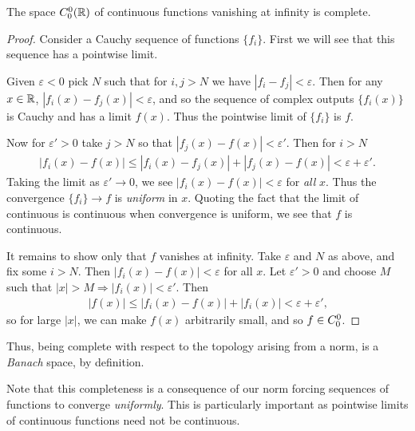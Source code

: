       \begin{thm}
        \label{thm:c00complete}
        The space ${C^0_0}(\mathbb{R})$ of continuous functions vanishing at infinity is complete.
      \end{thm}
      \begin{proof}
        Consider a Cauchy sequence of \Coo functions $\{f_i\}$.
        First we will see that this sequence has a pointwise limit.

        Given $\varepsilon<0$ pick $N$ such that for $i,j>N$ we have $|f_i-f_j|<\varepsilon$.
        Then for any $x\in\mathbb{R}$, $|f_i(x)-f_j(x)|<\varepsilon$, and so the sequence of complex outputs $\{f_i(x)\}$ is Cauchy and has a limit $f(x)$.
        Thus the pointwise limit of $\{f_i\}$ is $f$.
       
        Now for $\varepsilon'>0$ take $j>N$ so that $|f_j(x)-f(x)|<\varepsilon'$.
        Then for $i>N$
        \begin{align*}
          |f_i(x)-f(x)|\le|f_i(x)-f_j(x)|+|f_j(x)-f(x)|<\varepsilon+\varepsilon'\text{.}
        \end{align*}
        Taking the limit as $\varepsilon'\rightarrow0$, we see $|f_i(x)-f(x)|<\varepsilon$ for \emph{all} $x$.
        Thus the convergence $\{f_i\}\rightarrow f$ is \emph{uniform} in $x$.
        Quoting the fact that the limit of continuous is continuous when convergence is uniform, we see that $f$ is continuous.\footnotemark

        It remains to show only that $f$ vanishes at infinity.
        Take $\varepsilon$ and $N$ as above, and fix some $i>N$.
        Then $|f_i(x)-f(x)|<\varepsilon$ for all $x$.
        Let $\varepsilon'>0$ and choose $M$ such that $|x|>M\Rightarrow |f_i(x)|<\varepsilon'$.
        Then
        \begin{align*}
          |f(x)|\le|f_i(x)-f(x)|+|f_i(x)|<\varepsilon+\varepsilon'\text{,}
        \end{align*}
        so for large $|x|$, we can make $f(x)$ arbitrarily small, and so $f\in {C^0_0}$.
      \end{proof}
      \begin{rmk}
        Thus, being complete with respect to the topology arising from a norm, \Coo is a \emph{Banach} space, by definition.
      \end{rmk}
      \begin{rmk}
        Note that this completeness is a consequence of our norm forcing sequences of functions to converge \emph{uniformly}.
        This is particularly important as pointwise limits of continuous functions need not be continuous.
      \end{rmk}

